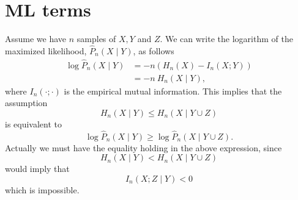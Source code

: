 \documentclass[12pt]{article}
\newcommand{\Le}{\left(}
\newcommand{\Ri}{\right)}
\begin{document}
\section{ML terms}
Assume we have $n$ samples of $X,Y$ and $Z$. We can write the logarithm of the maximized likelihood, $\hat{P}_n(X \mid Y)$, as follows
\begin{align*}
\log \hat{P}_n(X \mid Y) & = -n \Le H_n(X) - I_n(X;Y) \Ri \\
&= -n \  H_n(X\mid Y),
\end{align*}where $I_n(\cdot;\cdot)$ is the empirical mutual information. This implies that the assumption
$$
H_n(X \mid Y) \leq H_n(X \mid Y \cup Z)
$$ is equivalent to
$$
\log \hat{P}_n(X \mid Y) \geq \log \hat{P}_n(X \mid Y \cup Z). 
$$Actually we must have the equality holding in the above expression, since
$$
H_n(X \mid Y) < H_n(X \mid Y \cup Z)
$$ would imply that
$$
I_n(X ; Z \mid Y ) < 0
$$which is impossible.
\end{document}
